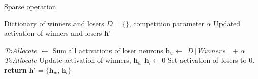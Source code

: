 %
%
%
%
%

\begin{algorithm}
    \caption{Sparse operation}
    \label{algo:sparse}
    \begin{algorithmic}[1]
    
    \INPUT Dictionary of winners and losers $D = \{\}$, competition parameter $\alpha$
    \OUTPUT Updated activation of winners and losers $\mathbf{h}'$

    \item[]
    \State \textit{ToAllocate} $\gets$ 
    \Comment Sum all activations of loser neurons
    \State $\mathbf{h}_{w} \gets$ $D[Winners]$ + $\alpha$ \textit{ToAllocate}
    \Comment Update activation of winners, $\mathbf{h}_{w}$
    \State $\mathbf{h}_{l} \gets 0$ 
    \Comment Set activation of losers to $0$.
    \State \textbf{return} $\mathbf{h}' = \{\mathbf{h}_{w}$, $\mathbf{h}_{l}\}$
    \end{algorithmic}
\end{algorithm}
